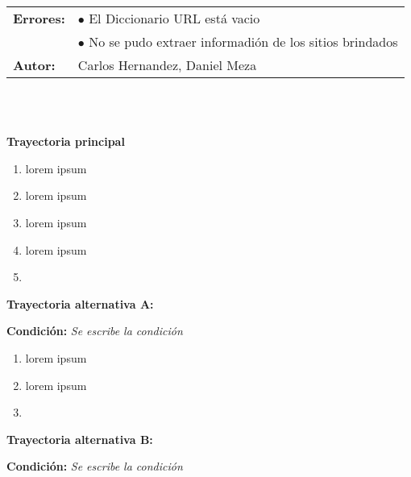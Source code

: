 \begin{tabular}{|l|l|}
	\textbf{Errores:} &$\bullet$ El Diccionario URL está vacio \\
	 &$\bullet$ No se pudo extraer informadión de los sitios brindados \\
	\hline
	\textbf{Autor:} & Carlos Hernandez, Daniel Meza \\
	\hline
\end{tabular}\\\\






\begin{large}
	\textbf{Trayectoria principal}\\
\end{large}	

\begin{enumerate}[1.]
	\item \actor lorem ipsum
	\item \sistema lorem ipsum
	\item \sistema lorem ipsum
	\item \sistema lorem ipsum
	\item \finCU	
\end{enumerate}



\begin{large}
	\textbf{Trayectoria alternativa A:}\\
\end{large}	
\textbf{Condición:} \textit{Se escribe la condición}
\begin{enumerate}[{A-}1.]

	\item \actor lorem ipsum
	\item \sistema lorem ipsum
	\item \finTA	

\end{enumerate}


\begin{large}
	\textbf{Trayectoria alternativa B:}\\
\end{large}	
\textbf{Condición:} \textit{Se escribe la condición}

